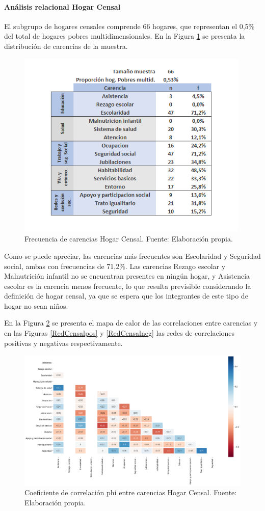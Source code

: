 \documentclass[12pt,letterpaper,spanish]{article}
\begin{document}
\paragraph{Análisis relacional Hogar Censal}
El subgrupo de hogares censales comprende 66 hogares, que representan el 0,5\% del total de hogares pobres multidimensionales. En la Figura \ref{freCensal} se presenta la distribución de carencias de la muestra.
\begin{figure}[H]
  \centering
    \includegraphics[height=9cm]{HOGARES/tabla_censal.png}
    \caption{Frecuencia de carencias Hogar Censal. Fuente: Elaboración propia.}
    \label{freCensal}
\end{figure}
Como se puede apreciar, las carencias más frecuentes son Escolaridad y Seguridad social, ambas con frecuencias de 71,2\%. Las carencias Rezago escolar y Malnutrición infantil no se encuentran presentes en ningún hogar, y Asistencia escolar es la carencia menos frecuente, lo que resulta previsible considerando la definición de hogar censal, ya que se espera que los integrantes de este tipo de hogar no sean niños. 

En la Figura \ref{HMCensal} se presenta el mapa de calor de las correlaciones entre carencias y en las Figuras \ref{RedCensalpos} y \ref{RedCensalneg} las redes de correlaciones positivas y negativas respectivamente.

\begin{figure}[H]
    \centering
    \includegraphics[width=\textwidth]{Heatmaps/Heatmap_pearson_car_censal.png}
    \caption{Coeficiente de correlación phi entre carencias Hogar Censal. Fuente: Elaboración propia.}
    \label{HMCensal}
\end{figure}
\end{document}
